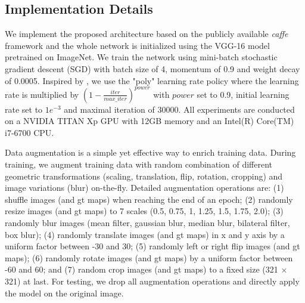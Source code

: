 \documentclass[journal]{IEEEtran}
\begin{document}
\subsection{Implementation Details}
We implement the proposed architecture based on the publicly available \emph{caffe}~\cite{jia2014caffe} framework and the whole network is initialized using the VGG-16 model\cite{russakovsky2015imagenet} pretrained on ImageNet.
We train the network using mini-batch stochastic gradient descent (SGD)\cite{krizhevsky2012imagenet} with batch size of 4, momentum of 0.9 and weight decay of 0.0005.
Inspired by \cite{chen2014semantic}, we use the "poly" learning rate policy where the learning rate is multiplied by $(1-\frac{iter}{max\_iter})^{power}$ with $power$ set to 0.9, initial learning rate set to $1e^{-3}$ and maximal iteration of 30000. All experiments are conducted on a NVIDIA TITAN Xp GPU with 12GB memory and an Intel(R) Core(TM) i7-6700 CPU.

Data augmentation is a simple yet effective way to enrich training data.
During training, we augment training data with random combination of different geometric transformations (scaling, translation, flip, rotation, cropping) and image variations (blur) on-the-fly. Detailed augmentation operations are:
(1) shuffle images (and gt maps) when reaching the end of an epoch;
(2) randomly resize images (and gt maps) to 7 scales (0.5, 0.75, 1, 1.25, 1.5, 1.75, 2.0);
(3) randomly blur images (mean filter, gaussian blur, median blur, bilateral filter, box blur);
(4) randomly translate images (and gt maps) in x and y axis by a uniform factor between -30 and 30;
(5) randomly left or right flip images (and gt maps);
(6) randomly rotate images (and gt maps) by a uniform factor between -60 and 60;
and (7) random crop images (and gt maps) to a fixed size (321 $\times$ 321) at last.
For testing, we drop all augmentation operations and directly apply the model on the original image.
\end{document}
